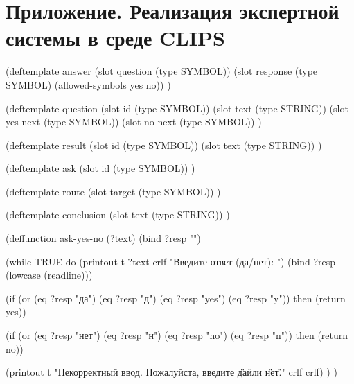 \documentclass[14pt,a4paper]{extarticle}
\begin{document}
\section*{Приложение. Реализация экспертной системы в среде CLIPS}
\begin{Code}
(deftemplate answer
  (slot question (type SYMBOL))
  (slot response (type SYMBOL) (allowed-symbols yes no))
)

(deftemplate question
  (slot id (type SYMBOL))
  (slot text (type STRING))
  (slot yes-next (type SYMBOL))
  (slot no-next (type SYMBOL))
)

(deftemplate result
  (slot id (type SYMBOL))
  (slot text (type STRING))
)

(deftemplate ask
  (slot id (type SYMBOL))
)

(deftemplate route
  (slot target (type SYMBOL))
)

(deftemplate conclusion
  (slot text (type STRING))
)

(deffunction ask-yes-no (?text)
  (bind ?resp "")

  (while TRUE do
    (printout t ?text crlf "Введите ответ (да/нет): ")
    (bind ?resp (lowcase (readline)))

    (if (or (eq ?resp "да") (eq ?resp "д") (eq ?resp "yes") (eq ?resp "y"))
      then
      (return yes))

    (if (or (eq ?resp "нет") (eq ?resp "н") (eq ?resp "no") (eq ?resp "n"))
      then
      (return no))

    (printout t "Некорректный ввод. Пожалуйста, введите \"да\" или \"нет\"." crlf crlf)
  )
)


\end{Code}
\end{document}
